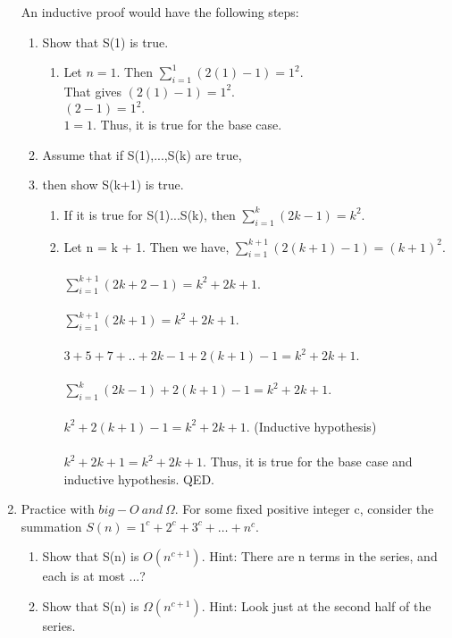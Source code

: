 \documentclass[12pt]{article}
\begin{document}
\begin{enumerate}
An inductive proof would have the following steps:
\begin{enumerate}
	\item  Show that S(1) is true.
     	 	\begin{enumerate}
     	\item Let $n = 1.$ Then $\sum_{i = 1}^{1}(2(1)-1) = 1^2.$\\ 
     	That gives $(2(1)-1) = 1^2.$\\ $(2-1) = 1^2.$\\ $1 = 1.$ Thus, it is true for the base case.\\	
     \end{enumerate}
     \item Assume that if S(1),...,S(k) are true, 
     \item then show S(k+1) is true.
     \begin{enumerate}
     	\item If it is true for S(1)...S(k), then $\sum_{i = 1}^{k}(2k-1) = k^2.$\\ 
     	\item Let n = k + 1. Then we have, $\sum_{i = 1}^{k+1}(2(k+1)-1) = (k+1)^2.$\\\\ $\sum_{i = 1}^{k+1}(2k+2-1) = k^2 + 2k + 1.$\\\\ $\sum_{i = 1}^{k+1}(2k+1) = k^2 + 2k + 1.$\\\\ $3 + 5 + 7 + .. + 2k-1 + 2(k+1)-1 = k^2 + 2k + 1.$\\\\ $\sum_{i = 1}^{k}(2k-1) + 2(k+1)-1 = k^2 + 2k + 1.$\\\\
     	$k^2 + 2(k+1)-1 = k^2 + 2k + 1.$ (Inductive hypothesis)\\\\ 
     	$k^2 + 2k + 1 = k^2 + 2k + 1.$ Thus, it is true for the base case and inductive hypothesis. QED.
     \end{enumerate}
\end{enumerate}

\newpage
\item Practice with $big-O ~and ~\Omega$. For some fixed positive integer c, consider the summation
$S(n)=1^c +2^c +3^c + \dots +n^c.$
\begin{enumerate}
	\item Show that S(n) is $O(n^{c+1})$. Hint: There are n terms in the series, and each is at most ...?
    \item Show that S(n) is $ \Omega(n^{c+1})$. Hint: Look just at the second half of the series.
\end{enumerate}



\end{enumerate}
\end{document}
